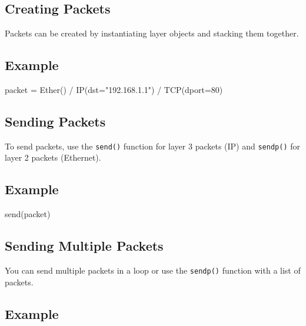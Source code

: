 \documentclass[
  letterpaper,
  DIV=11,
  numbers=noendperiod]{scrreprt}
\newenvironment{Shaded}{\begin{snugshade}}{\end{snugshade}}
\newcommand{\DecValTok}[1]{\textcolor[rgb]{0.68,0.00,0.00}{#1}}
\newcommand{\NormalTok}[1]{\textcolor[rgb]{0.00,0.23,0.31}{#1}}
\newcommand{\OperatorTok}[1]{\textcolor[rgb]{0.37,0.37,0.37}{#1}}
\newcommand{\StringTok}[1]{\textcolor[rgb]{0.13,0.47,0.30}{#1}}
\begin{document}
\subsection{Creating Packets}\label{creating-packets}

Packets can be created by instantiating layer objects and stacking them
together.

\subsection{Example}\label{example-60}

\begin{Shaded}
\begin{Highlighting}[]
\NormalTok{packet }\OperatorTok{=}\NormalTok{ Ether() }\OperatorTok{/}\NormalTok{ IP(dst}\OperatorTok{=}\StringTok{"192.168.1.1"}\NormalTok{) }\OperatorTok{/}\NormalTok{ TCP(dport}\OperatorTok{=}\DecValTok{80}\NormalTok{)}
\end{Highlighting}
\end{Shaded}

\subsection{Sending Packets}\label{sending-packets}

To send packets, use the \texttt{send()} function for layer 3 packets
(IP) and \texttt{sendp()} for layer 2 packets (Ethernet).

\subsection{Example}\label{example-61}

\begin{Shaded}
\begin{Highlighting}[]
\NormalTok{send(packet)}
\end{Highlighting}
\end{Shaded}

\subsection{Sending Multiple Packets}\label{sending-multiple-packets}

You can send multiple packets in a loop or use the \texttt{sendp()}
function with a list of packets.

\subsection{Example}\label{example-62}
\end{document}
